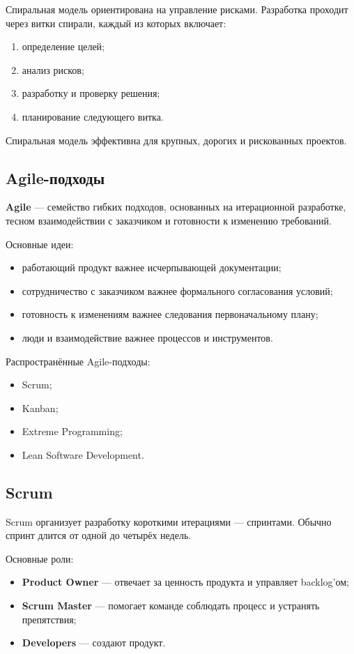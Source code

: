 \documentclass[12pt,a4paper]{article}
\begin{document}
Спиральная модель ориентирована на управление рисками. Разработка проходит через витки спирали, каждый из которых включает:
\begin{enumerate}
    \item определение целей;
    \item анализ рисков;
    \item разработку и проверку решения;
    \item планирование следующего витка.
\end{enumerate}

Спиральная модель эффективна для крупных, дорогих и рискованных проектов.

\subsection{Agile-подходы}

\textbf{Agile} --- семейство гибких подходов, основанных на итерационной разработке, тесном взаимодействии с заказчиком и готовности к изменению требований.

Основные идеи:
\begin{itemize}
    \item работающий продукт важнее исчерпывающей документации;
    \item сотрудничество с заказчиком важнее формального согласования условий;
    \item готовность к изменениям важнее следования первоначальному плану;
    \item люди и взаимодействие важнее процессов и инструментов.
\end{itemize}

Распространённые Agile-подходы:
\begin{itemize}
    \item Scrum;
    \item Kanban;
    \item Extreme Programming;
    \item Lean Software Development.
\end{itemize}

\subsection{Scrum}

Scrum организует разработку короткими итерациями --- спринтами. Обычно спринт длится от одной до четырёх недель.

Основные роли:
\begin{itemize}
    \item \textbf{Product Owner} --- отвечает за ценность продукта и управляет backlog'ом;
    \item \textbf{Scrum Master} --- помогает команде соблюдать процесс и устранять препятствия;
    \item \textbf{Developers} --- создают продукт.
\end{itemize}
\end{document}
